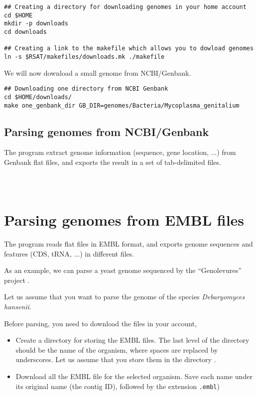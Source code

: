 \begin{verbatim}
## Creating a directory for downloading genomes in your home account
cd $HOME
mkdir -p downloads
cd downloads

## Creating a link to the makefile which allows you to dowload genomes
ln -s $RSAT/makefiles/downloads.mk ./makefile
\end{verbatim}

We will now download a small genome from NCBI/Genbank. 

\begin{verbatim}
## Downloading one directory from NCBI Genbank
cd $HOME/downloads/
make one_genbank_dir GB_DIR=genomes/Bacteria/Mycoplasma_genitalium
\end{verbatim}


\subsection{Parsing genomes from NCBI/Genbank}

The program  extract genome information
(sequence, gene location, ...) from Genbank flat files, and exports
the result in a set of tab-delimited files.

\begin{verbatim}



\end{verbatim}


\section{Parsing genomes from EMBL files}

The program  reads flat files in EMBL format,
and exports genome sequences and features (CDS, tRNA, ...) in
different files.

As an example, we can parse a yeast genome sequenced by the
``Genolevures'' project
.

Let us assume that you want to parse the genome of the species
\textit{Debaryomyces hansenii}.

Before parsing, you need to download the files in your account, 

\begin{itemize}
\item Create a directory for storing the EMBL files. The last level of
  the directory should be the name of the organism, where spaces are
  replaced by underscores. Let us assume that you store them in
  the directory .

\item Download all the EMBL file for the selected organism. Save each
  name under its original name (the contig ID), followed by the
  extension \texttt{.embl})

\end{itemize}

